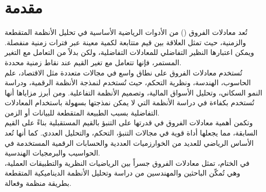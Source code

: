 \chapter*{مقدمة}
	
	تُعد معادلات الفروق () من الأدوات الرياضية الأساسية في تحليل الأنظمة المتقطعة والزمنية، حيث تمثل العلاقة بين قيم متتابعة لكمية معينة عبر فترات زمنية منفصلة. ويمكن اعتبارها النظير التفاضلي للمعادلات التفاضلية، ولكن بدلاً من التعامل مع التغير المستمر، فإنها تتعامل مع تغير القيم عند نقاط زمنية محددة.\\
	\noindent
	تُستخدم معادلات الفروق على نطاق واسع في مجالات متعددة مثل الاقتصاد، علم الحاسوب، الهندسة، ونظرية التحكم، حيث تُستخدم لنمذجة الأنظمة الرقمية، ودراسة النمو السكاني، وتحليل الأسواق المالية، وتصميم الأنظمة التفاعلية. ومن أبرز مزاياها أنها تُستخدم بكفاءة في دراسة الأنظمة التي لا يمكن نمذجتها بسهولة باستخدام المعادلات التفاضلية بسبب الطبيعة المتقطعة للبيانات أو الزمن.\\
	\noindent
	وتكمن أهمية معادلات الفروق في قدرتها على التنبؤ بالقيم المستقبلية بناءً على القيم السابقة، مما يجعلها أداة قوية في مجالات التنبؤ، التحكم، والتحليل العددي. كما أنها تُعد الأساس الرياضي للعديد من الخوارزميات العددية والحسابات الرقمية المستخدمة في الحواسيب والبرمجيات الهندسية.\\
	\noindent
	في الختام، تمثل معادلات الفروق جسراً بين الرياضيات النظرية والتطبيقات العملية، وهي تُمكّن الباحثين والمهندسين من دراسة وتحليل الأنظمة الديناميكية المتقطعة بطريقة منظمة وفعالة.
	
